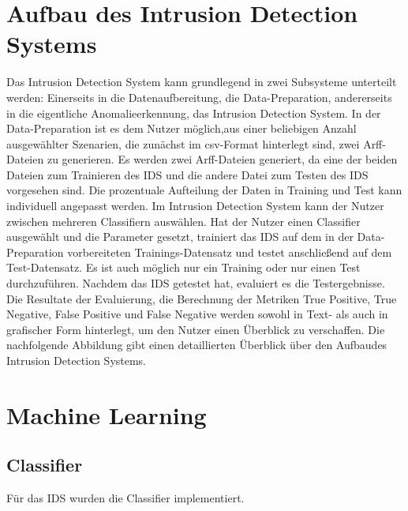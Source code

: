 \documentclass[main.tex]{subfiles}
\begin{document}
\section{Aufbau des Intrusion Detection Systems}

Das Intrusion Detection System kann grundlegend in zwei Subsysteme unterteilt werden: Einerseits in die Datenaufbereitung, die Data-Preparation, andererseits in die eigentliche Anomalieerkennung, das Intrusion Detection System.
In der Data-Preparation ist es dem Nutzer möglich,aus einer beliebigen Anzahl ausgewählter Szenarien, die zunächst im csv-Format hinterlegt sind, zwei Arff-Dateien zu generieren. Es werden zwei Arff-Dateien generiert, da eine der beiden Dateien zum Trainieren des IDS und die andere Datei zum Testen des IDS vorgesehen sind. Die prozentuale Aufteilung der Daten in Training und Test kann individuell angepasst werden.
Im Intrusion Detection System kann der Nutzer zwischen mehreren Classifiern auswählen. Hat der Nutzer einen Classifier ausgewählt und die Parameter gesetzt, trainiert das IDS auf dem in der Data-Preparation vorbereiteten Trainings-Datensatz und testet anschließend auf dem Test-Datensatz. Es ist auch möglich nur ein Training oder nur einen Test durchzuführen. Nachdem das IDS getestet hat, evaluiert es die Testergebnisse. Die Resultate der Evaluierung, die Berechnung der Metriken True Positive, True Negative, False Positive und False Negative werden sowohl in Text- als auch in grafischer Form hinterlegt, um den Nutzer einen Überblick zu verschaffen. 
Die nachfolgende Abbildung gibt einen detaillierten Überblick über den Aufbaudes Intrusion Detection Systems. 


\section{Machine Learning}
\subsection{Classifier}
Für das IDS wurden die Classifier implementiert.
\end{document}
